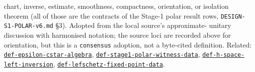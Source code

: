 \begin{defnote}
chart, inverse, estimate, smoothness, compactness, orientation, or isolation
theorem (all of those are the contracts of the Stage-1 polar result rows,
\texttt{DESIGN-\allowbreak{}S1-\allowbreak{}POLAR-\allowbreak{}v6.\allowbreak{}md} \S{}3). Adopted from the local source's approximate-
unitary discussion with harmonised notation; the source loci are recorded
above for orientation, but this is a \texttt{consensus} adoption, not a byte-cited
definition. Related: \hyperref[def:epsilon-cstar-algebra]{\texttt{def-\allowbreak{}epsilon-\allowbreak{}cstar-\allowbreak{}algebra}},
\hyperref[def:stage1-polar-witness-data]{\texttt{def-\allowbreak{}stage1-\allowbreak{}polar-\allowbreak{}witness-\allowbreak{}data}}, \hyperref[def:h-space-left-inversion]{\texttt{def-\allowbreak{}h-\allowbreak{}space-\allowbreak{}left-\allowbreak{}inversion}},
\hyperref[def:lefschetz-fixed-point-data]{\texttt{def-\allowbreak{}lefschetz-\allowbreak{}fixed-\allowbreak{}point-\allowbreak{}data}}.
\end{defnote}

